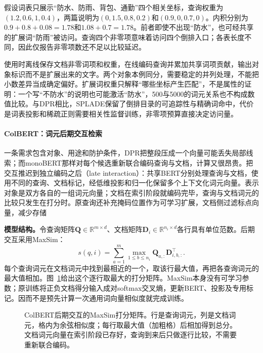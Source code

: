 假设词表只展示“防水、防雨、背包、通勤”四个相关坐标，查询权重为$(1.2,0.6,1,0.4)$，两篇说明为$(0,1.5,0.8,0.2)$和$(0.9,0,0.7,0)$。内积分别为$0.9+0.8+0.08=1.78$和$1.08+0.7=1.78$。前者即使不出现“防水”，也可经共享的扩展词“防雨”被访问。查询四个非零项意味着访问四个倒排入口；各表长度不同，因此仅报告非零项数还不足以比较延迟。

使用时离线保存文档非零词项和权重，在线编码查询并累加共享词项贡献，输出对象标识而不是扩展出来的文字。两个对象本例同分，需要稳定的并列处理，不能把小数差异当成确定偏好。扩展词权重只解释“哪些坐标产生匹配”，不是属性的证明：一个写“不防水”的说明也可能激活“防水”，500与5000的词元关系也不构成数值比较。与DPR相比，SPLADE保留了倒排目录的可追踪性与精确词命中，代价是词表投影和稀疏正则需要相关性监督训练，非零项预算直接决定访问量。

\Needspace{100mm}
\paragraph{ColBERT：词元后期交互检索}
\label{sec:rs-search-colbert}

一条需求包含对象、用途和防护条件，DPR把整段压成一个向量可能丢失局部线索；而monoBERT那样对每个候选重新联合编码查询与文档，计算又很昂贵。把交互推迟到独立编码之后（late interaction）：共享BERT分别处理查询与文档，使用不同的查询、文档标记，经低维投影和归一化保留多个上下文化词元向量。表示对象是双方各自的一组词元向量；文档在索引阶段就编码完毕，查询与文档词元的比较只发生在打分时。原查询还补充掩码位置作为可学习扩展，文档侧过滤标点向量，减少存储

\textbf{模型结构。}令查询矩阵$\bm Q\in\mathbb R^{m\times d}$、文档矩阵$\bm D_i\in\mathbb R^{n_i\times d}$各行具有单位范数。后期交互采用MaxSim：
\begin{equation}
 s(q,i)=\sum_{a=1}^{m}\max_{1\leq b\leq n_i}
             \bm Q_{a,:}\bm D_{i,b,:}^{\top}.
 \label{eq:rs-search-maxsim}
\end{equation}
每个查询词元在文档词元中找到最相近的一个，取该行最大值，再把各查询词元的最大值相加。图~\ref{fig:rs-search-maxsim}给出这个逐行取最大的打分矩阵。MaxSim本身没有可学习参数；原训练将正负文档得分输入成对softmax交叉熵，更新BERT、投影及专用标记。因而不是预先计算一次通用词向量相似度就完成训练。

\begin{figure}[htbp]
 \centering
 
 \caption{ColBERT后期交互的MaxSim打分矩阵。行是查询词元，列是文档词元，格内为余弦相似度；每行取最大值（加粗格）后相加得到总分。文档词元向量在索引阶段已存好，查询到来后只做逐行比较，不需要重新联合编码。}
 \label{fig:rs-search-maxsim}
\end{figure}

